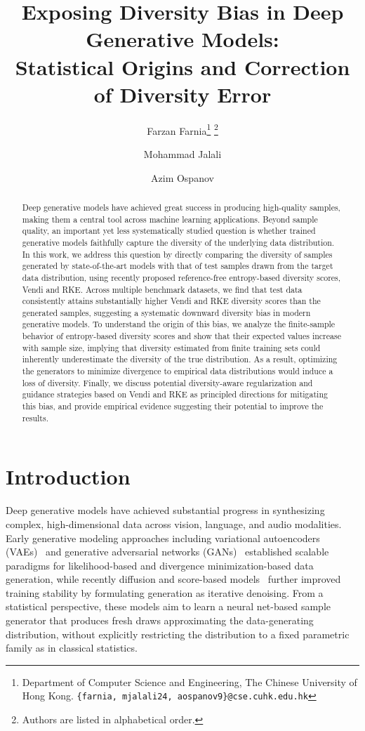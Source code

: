 \documentclass{article}
\title{\textbf{Exposing Diversity Bias in Deep Generative Models: \\ Statistical Origins and Correction of Diversity Error}}
\date{}
\author{
Farzan Farnia\thanks{Department of Computer Science and Engineering, 
The Chinese University of Hong Kong. 
\texttt{\{farnia, mjalali24, aospanov9\}@cse.cuhk.edu.hk}}
\thanks{Authors are listed in alphabetical order.}
\and
Mohammad Jalali\footnotemark[1]
\and
Azim Ospanov\footnotemark[1]
}
\theoremstyle{plain}
\theoremstyle{definition}
\begin{document}
\maketitle

\begin{abstract}
Deep generative models have achieved great success in producing high-quality samples, making them a central tool across machine learning applications. Beyond sample quality, an important yet less systematically studied question is whether trained generative models faithfully capture the diversity of the underlying data distribution. In this work, we address this question by directly comparing the diversity of samples generated by state-of-the-art models with that of test samples drawn from the target data distribution, using recently proposed reference-free entropy-based diversity scores, Vendi and RKE. Across multiple benchmark datasets, we find that test data consistently attains substantially higher Vendi and RKE diversity scores than the generated samples, suggesting a systematic downward diversity bias in modern generative models. To understand the origin of this bias, we analyze the finite-sample behavior of entropy-based diversity scores and show that their expected values increase with sample size, implying that diversity estimated from finite training sets could inherently underestimate the diversity of the true distribution. As a result, optimizing the generators to minimize divergence to empirical data distributions would induce a loss of diversity. Finally, we discuss potential diversity-aware regularization and guidance strategies based on Vendi and RKE as principled directions for mitigating this bias, and provide empirical evidence suggesting their potential to improve the results.
\end{abstract}

\section{Introduction}
Deep generative models have achieved substantial progress in synthesizing complex, high-dimensional data across vision, language, and audio modalities. Early generative modeling approaches including variational autoencoders (VAEs)~\citep{kingma2013vae} and generative adversarial networks (GANs)~\citep{goodfellow2014gan} established scalable paradigms for likelihood-based and divergence minimization-based data generation, while recently diffusion and score-based models~\citep{song2019generative,ho2020ddpm,song2021sde} further improved training stability by formulating generation as iterative denoising. From a statistical perspective, these models aim to learn a neural net-based sample generator that produces fresh draws approximating the data-generating distribution, without explicitly restricting the distribution to a fixed parametric family as in classical statistics.
\end{document}
